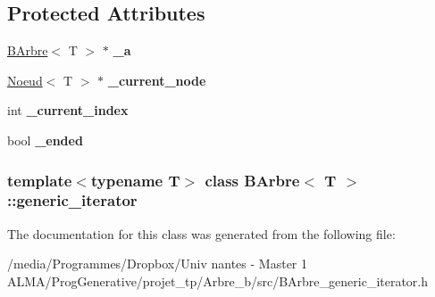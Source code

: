 \subsection*{Protected Attributes}
\begin{DoxyCompactItemize}
\item 
\hypertarget{classBArbre_1_1generic__iterator_aa36f57491e6c5024ea0673e6ae123ecd}{
\hyperlink{classBArbre}{BArbre}$<$ T $>$ $\ast$ {\bfseries \_\-a}}
\label{classBArbre_1_1generic__iterator_aa36f57491e6c5024ea0673e6ae123ecd}

\item 
\hypertarget{classBArbre_1_1generic__iterator_ae20f521a11ce3c0f082c36ea3ba77164}{
\hyperlink{classNoeud}{Noeud}$<$ T $>$ $\ast$ {\bfseries \_\-current\_\-node}}
\label{classBArbre_1_1generic__iterator_ae20f521a11ce3c0f082c36ea3ba77164}

\item 
\hypertarget{classBArbre_1_1generic__iterator_a9150be6f68442eca99ddd8687f19c53b}{
int {\bfseries \_\-current\_\-index}}
\label{classBArbre_1_1generic__iterator_a9150be6f68442eca99ddd8687f19c53b}

\item 
\hypertarget{classBArbre_1_1generic__iterator_ae46ae1021d2e230d26893931e27060b4}{
bool {\bfseries \_\-ended}}
\label{classBArbre_1_1generic__iterator_ae46ae1021d2e230d26893931e27060b4}

\end{DoxyCompactItemize}
\subsubsection*{template$<$typename T$>$ class BArbre$<$ T $>$::generic\_\-iterator}



The documentation for this class was generated from the following file:\begin{DoxyCompactItemize}
\item 
/media/Programmes/Dropbox/Univ nantes -\/ Master 1 ALMA/ProgGenerative/projet\_\-tp/Arbre\_\-b/src/BArbre\_\-generic\_\-iterator.h\end{DoxyCompactItemize}
